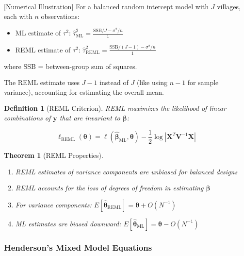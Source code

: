 \documentclass{article}
\newtheorem{definition}{Definition}
\newtheorem{theorem}{Theorem}
\begin{document}
[Numerical Illustration]
For a balanced random intercept model with $J$ villages, each with $n$ observations:
\begin{itemize}
    \item ML estimate of $\tau^2$: $\hat{\tau}^2_{\text{ML}} = \frac{\text{SSB}/J - \sigma^2/n}{1}$
    \item REML estimate of $\tau^2$: $\hat{\tau}^2_{\text{REML}} = \frac{\text{SSB}/(J-1) - \sigma^2/n}{1}$
\end{itemize}
where SSB = between-group sum of squares.

The REML estimate uses $J-1$ instead of $J$ (like using $n-1$ for sample variance), accounting for estimating the overall mean.


\begin{definition}[REML Criterion]
REML maximizes the likelihood of linear combinations of $\mathbf{y}$ that are invariant to $\boldsymbol{\beta}$:
\end{definition}
\begin{equation}
\ell_{\text{REML}}(\boldsymbol{\theta}) = \ell(\hat{\boldsymbol{\beta}}_{\text{ML}}, \boldsymbol{\theta}) - \frac{1}{2}\log|\mathbf{X}^T\mathbf{V}^{-1}\mathbf{X}|
\end{equation}


\begin{theorem}[REML Properties]
\begin{enumerate}
    \item REML estimates of variance components are unbiased for balanced designs
    \item REML accounts for the loss of degrees of freedom in estimating $\boldsymbol{\beta}$
    \item For variance components: $E[\hat{\boldsymbol{\theta}}_{\text{REML}}] = \boldsymbol{\theta} + O(N^{-1})$
    \item ML estimates are biased downward: $E[\hat{\boldsymbol{\theta}}_{\text{ML}}] = \boldsymbol{\theta} - O(N^{-1})$
\end{enumerate}
\end{theorem}

\subsubsection{Henderson's Mixed Model Equations}
\end{document}
